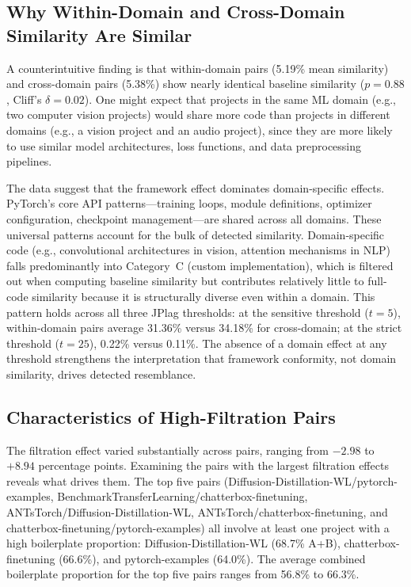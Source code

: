 \documentclass[smallextended,natbib]{svjour3}
\begin{document}
\subsection{Why Within-Domain and Cross-Domain Similarity Are Similar}

A counterintuitive finding is that within-domain pairs (5.19\% mean similarity) and cross-domain pairs (5.38\%) show nearly identical baseline similarity ($p = 0.88$, Cliff's $\delta = 0.02$). One might expect that projects in the same ML domain (e.g., two computer vision projects) would share more code than projects in different domains (e.g., a vision project and an audio project), since they are more likely to use similar model architectures, loss functions, and data preprocessing pipelines.

The data suggest that the framework effect dominates domain-specific effects. PyTorch's core API patterns---training loops, module definitions, optimizer configuration, checkpoint management---are shared across all domains. These universal patterns account for the bulk of detected similarity. Domain-specific code (e.g., convolutional architectures in vision, attention mechanisms in NLP) falls predominantly into Category~C (custom implementation), which is filtered out when computing baseline similarity but contributes relatively little to full-code similarity because it is structurally diverse even within a domain. This pattern holds across all three JPlag thresholds: at the sensitive threshold ($t=5$), within-domain pairs average 31.36\% versus 34.18\% for cross-domain; at the strict threshold ($t=25$), 0.22\% versus 0.11\%. The absence of a domain effect at any threshold strengthens the interpretation that framework conformity, not domain similarity, drives detected resemblance.

\subsection{Characteristics of High-Filtration Pairs}

The filtration effect varied substantially across pairs, ranging from $-2.98$ to $+8.94$ percentage points. Examining the pairs with the largest filtration effects reveals what drives them. The top five pairs (Diffusion-Distillation-WL/pytorch-examples, BenchmarkTransferLearning/chatterbox-finetuning, ANTsTorch/Diffusion-Distillation-WL, ANTsTorch/chatterbox-finetuning, and chatterbox-finetuning/pytorch-examples) all involve at least one project with a high boilerplate proportion: Diffusion-Distillation-WL (68.7\% A+B), chatterbox-finetuning (66.6\%), and pytorch-examples (64.0\%). The average combined boilerplate proportion for the top five pairs ranges from 56.8\% to 66.3\%.
\end{document}
